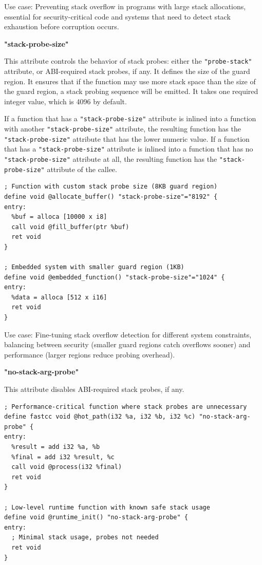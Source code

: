 Use case: Preventing stack overflow in programs with large stack allocations, essential for security-critical code and systems that need to detect stack exhaustion before corruption occurs.

\textbf{"stack-probe-size"}

This attribute controls the behavior of stack probes: either the \texttt{"probe-stack"} attribute, or ABI-required stack probes, if any.
It defines the size of the guard region.
It ensures that if the function may use more stack space than the size of the guard region, a stack probing sequence will be emitted.
It takes one required integer value, which is 4096 by default.

If a function that has a \texttt{"stack-probe-size"} attribute is inlined into a function with another \texttt{"stack-probe-size"} attribute, the resulting function has the \texttt{"stack-probe-size"} attribute that has the lower numeric value.
If a function that has a \texttt{"stack-probe-size"} attribute is inlined into a function that has no \texttt{"stack-probe-size"} attribute at all, the resulting function has the \texttt{"stack-probe-size"} attribute of the callee.

\begin{lstlisting}[style=ir]
; Function with custom stack probe size (8KB guard region)
define void @allocate_buffer() "stack-probe-size"="8192" {
entry:
  %buf = alloca [10000 x i8]
  call void @fill_buffer(ptr %buf)
  ret void
}

; Embedded system with smaller guard region (1KB)
define void @embedded_function() "stack-probe-size"="1024" {
entry:
  %data = alloca [512 x i16]
  ret void
}
\end{lstlisting}

Use case: Fine-tuning stack overflow detection for different system constraints, balancing between security (smaller guard regions catch overflows sooner) and performance (larger regions reduce probing overhead).

\textbf{"no-stack-arg-probe"}

This attribute disables ABI-required stack probes, if any.

\begin{lstlisting}[style=ir]
; Performance-critical function where stack probes are unnecessary
define fastcc void @hot_path(i32 %a, i32 %b, i32 %c) "no-stack-arg-probe" {
entry:
  %result = add i32 %a, %b
  %final = add i32 %result, %c
  call void @process(i32 %final)
  ret void
}

; Low-level runtime function with known safe stack usage
define void @runtime_init() "no-stack-arg-probe" {
entry:
  ; Minimal stack usage, probes not needed
  ret void
}
\end{lstlisting}

